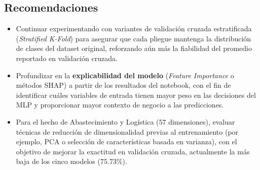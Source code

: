 \documentclass{article}
\begin{document}
\subsection{Recomendaciones}
\begin{itemize}
    \item Continuar experimentando con variantes de validación cruzada estratificada (\textit{Stratified K-Fold}) para asegurar que cada pliegue mantenga la distribución de clases del dataset original, reforzando aún más la fiabilidad del promedio reportado en validación cruzada.
    \item Profundizar en la \textbf{explicabilidad del modelo} (\textit{Feature Importance} o métodos SHAP) a partir de los resultados del notebook, con el fin de identificar cuáles variables de entrada tienen mayor peso en las decisiones del MLP y proporcionar mayor contexto de negocio a las predicciones.
    \item Para el hecho de Abastecimiento y Logística ($57$ dimensiones), evaluar técnicas de reducción de dimensionalidad previas al entrenamiento (por ejemplo, PCA o selección de características basada en varianza), con el objetivo de mejorar la exactitud en validación cruzada, actualmente la más baja de los cinco modelos ($75.73\%$).
\end{itemize}

\renewcommand{\refname}{}



\vfill
\end{document}

